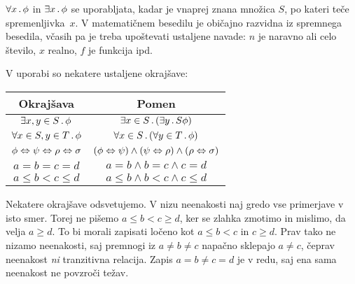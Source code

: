  $\forall x \,.\, \phi$ in
$\exists x \,.\, \phi$ se uporabljata, kadar je vnaprej znana množica $S$,
po kateri teče spremenljivka~$x$. V matematičnem besedilu je običajno
razvidna iz spremnega besedila, včasih pa je treba upoštevati
ustaljene navade: $n$ je naravno ali celo število, $x$ realno, $f$ je
funkcija ipd.

V uporabi so nekatere ustaljene okrajšave:
%
\begin{center}
  \begin{tabular}{cc}
    \toprule
    Okrajšava & Pomen \\ \midrule
    $\exists x,y \in S \,.\, \phi$
    &
    $\exists x \in S \,.\, (\exists y \,.\,{S} \phi)$
    \\
    $\forall x \in S, y \in T \,.\, \phi$
    &
    $\forall x \in S \,.\,(\forall y \in T \,.\, \phi)$
    \\
    $\phi \Leftrightarrow \psi \Leftrightarrow \rho \Leftrightarrow \sigma$
    &
    $(\phi \Leftrightarrow \psi) \land (\psi \Leftrightarrow \rho) \land (\rho \Leftrightarrow \sigma)$
    \\
    $a = b = c = d$
    &
    $a = b \land b = c \land c = d$
    \\
    $a \leq b < c \leq d$
    &
    $a \leq b \land b < c \land c \leq d$
    \\
    \bottomrule
  \end{tabular}
\end{center}
%
Nekatere okrajšave odsvetujemo. V nizu neenakosti naj gredo vse
primerjave v isto smer. Torej ne pišemo $a \leq b < c \geq d$, ker se
zlahka zmotimo in mislimo, da velja $a \geq d$. To bi morali zapisati
ločeno kot $a \leq b < c$ in $c \geq d$. Prav tako ne nizamo neenakosti,
saj premnogi iz $a \neq b \neq c$ napačno sklepajo $a \neq c$,
čeprav neenakost \emph{ni} tranzitivna relacija. Zapis $a =
b \neq c = d$ je v redu, saj ena sama neenakost ne povzroči težav.

